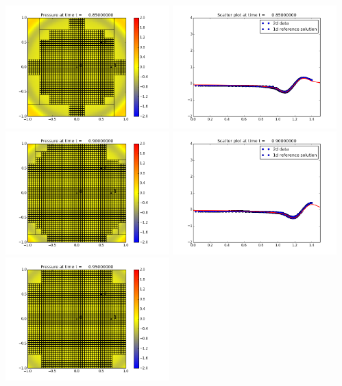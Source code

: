 \documentclass[11pt]{article}
\begin{document}
\vskip 10pt 
\includegraphics[width=0.475\textwidth]{frame0017fig0.png}
\includegraphics[width=0.475\textwidth]{frame0017fig3.png}
\vskip 10pt 
\includegraphics[width=0.475\textwidth]{frame0018fig0.png}
\includegraphics[width=0.475\textwidth]{frame0018fig3.png}
\vskip 10pt 
\includegraphics[width=0.475\textwidth]{frame0019fig0.png}
\end{document}
